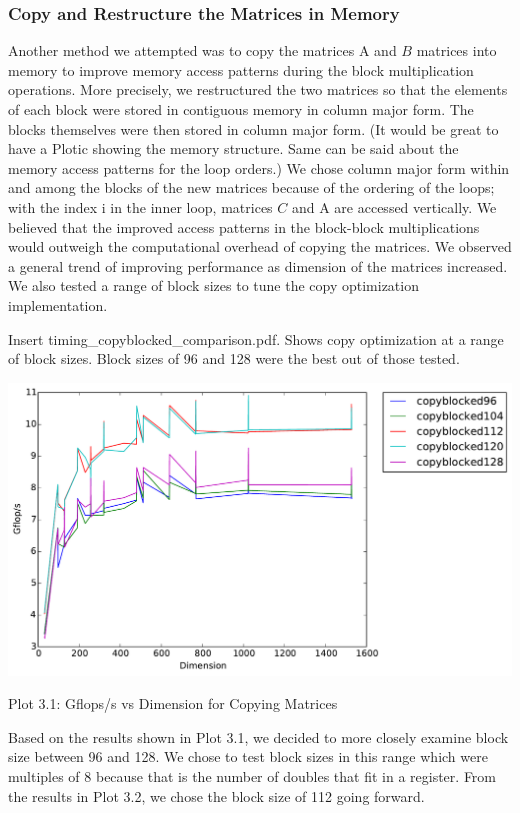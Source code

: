 \documentclass[12pt]{article}
\begin{document}
\subsubsection{Copy and Restructure the Matrices in Memory}

Another method we attempted was to copy the matrices A and $B$ matrices into memory to improve memory access patterns during the block multiplication operations. More precisely, we restructured the two matrices so that the elements of each block were stored in contiguous memory in column major form. The blocks themselves were then stored in column major form. (It would be great to have a Plotic showing the memory structure. Same can be said about the memory access patterns for the loop orders.) We chose column major form within and among the blocks of the new matrices because of the ordering of the loops; with the index i in the inner loop, matrices $C$ and A are accessed vertically. We believed that the improved access patterns in the block-block multiplications would outweigh the computational overhead of copying the matrices. We observed a general trend of improving performance as dimension of the matrices increased. We also tested a range of block sizes to tune the copy optimization implementation. 

Insert timing\_copyblocked\_comparison.pdf. Shows copy optimization at a range of block sizes. Block sizes of 96 and 128 were the best out of those tested.

\begin{center}
\includegraphics[width=16cm]{timing_copyblocked_comparison_zoom.pdf}

Plot 3.1: Gflops/s vs Dimension for Copying Matrices
\end{center}

Based on the results shown in Plot 3.1, we decided to more closely examine block size between 96 and 128. We chose to test block sizes in this range which were multiples of 8 because that is the number of doubles that fit in a register. From the results in Plot 3.2, we chose the block size of 112 going forward.
\end{document}
